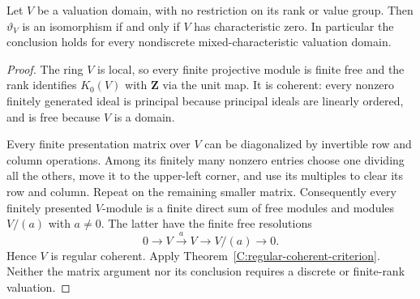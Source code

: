 \begin{corollary}
\label{C:valuation-domain-criterion}
Let $V$ be a valuation domain, with no restriction on its
rank or value group.  Then $\vartheta_V$ is an isomorphism
if and only if $V$ has characteristic zero.
In particular the conclusion holds for every nondiscrete
mixed-characteristic valuation domain.
\end{corollary}
\begin{proof}
The ring $V$ is local, so every finite projective module
is finite free and the rank identifies $K_0(V)$ with
$\mathbf Z$ via the unit map.
It is coherent: every nonzero finitely generated ideal
is principal because principal ideals are linearly
ordered, and is free because $V$ is a domain.

Every finite presentation matrix over $V$ can be
diagonalized by invertible row and column operations.
Among its finitely many nonzero entries choose one
dividing all the others, move it to the upper-left
corner, and use its multiples to clear its row and
column.  Repeat on the remaining smaller matrix.
Consequently every finitely presented $V$-module is
a finite direct sum of free modules and modules
$V/(a)$ with $a\ne0$.
The latter have the finite free resolutions
\[
 0\longrightarrow V\xrightarrow{\ a\ }V
        \longrightarrow V/(a)\longrightarrow0.
\]
Hence $V$ is regular coherent.  Apply
Theorem~\ref{C:regular-coherent-criterion}.
Neither the matrix argument nor its conclusion
requires a discrete or finite-rank valuation.
\end{proof}


